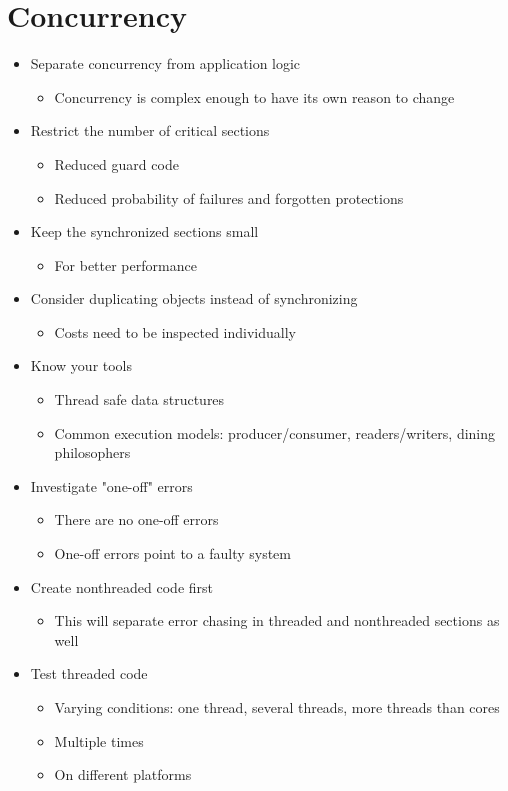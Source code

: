 
\section{Concurrency}
\begin{itemize}
    \item Separate concurrency from application logic
    \begin{itemize}
        \item Concurrency is complex enough to have its own reason to change
    \end{itemize}
    \item Restrict the number of critical sections
    \begin{itemize}
        \item Reduced guard code
        \item Reduced probability of failures and forgotten protections
    \end{itemize}
    \item Keep the synchronized sections small
    \begin{itemize}
        \item For better performance
    \end{itemize}
    \item Consider duplicating objects instead of synchronizing
    \begin{itemize}
        \item Costs need to be inspected individually
    \end{itemize}
    \item Know your tools
    \begin{itemize}
        \item Thread safe data structures
        \item Common execution models: producer/consumer, readers/writers, dining philosophers
    \end{itemize}
    \item Investigate "one-off" errors
    \begin{itemize}
        \item There are no one-off errors
        \item One-off errors point to a faulty system
    \end{itemize}
    \item Create nonthreaded code first
    \begin{itemize}
        \item This will separate error chasing in threaded and nonthreaded sections as well
    \end{itemize}
    \item Test threaded code
    \begin{itemize}
        \item Varying conditions: one thread, several threads, more threads than cores
        \item Multiple times
        \item On different platforms
    \end{itemize}
\end{itemize}